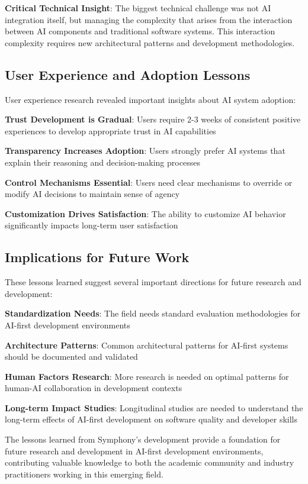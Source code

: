 \begin{alertbox}
\textbf{Critical Technical Insight}: The biggest technical challenge was not AI integration itself, but managing the complexity that arises from the interaction between AI components and traditional software systems. This interaction complexity requires new architectural patterns and development methodologies.
\end{alertbox}

\subsection*{User Experience and Adoption Lessons}

User experience research revealed important insights about AI system adoption:

\begin{expandedlist}
    \item \textbf{Trust Development is Gradual}: Users require 2-3 weeks of consistent positive experiences to develop appropriate trust in AI capabilities
    \item \textbf{Transparency Increases Adoption}: Users strongly prefer AI systems that explain their reasoning and decision-making processes
    \item \textbf{Control Mechanisms Essential}: Users need clear mechanisms to override or modify AI decisions to maintain sense of agency
    \item \textbf{Customization Drives Satisfaction}: The ability to customize AI behavior significantly impacts long-term user satisfaction
\end{expandedlist}

\subsection*{Implications for Future Work}

These lessons learned suggest several important directions for future research and development:

\begin{expandedlist}
    \item \textbf{Standardization Needs}: The field needs standard evaluation methodologies for AI-first development environments
    \item \textbf{Architecture Patterns}: Common architectural patterns for AI-first systems should be documented and validated
    \item \textbf{Human Factors Research}: More research is needed on optimal patterns for human-AI collaboration in development contexts
    \item \textbf{Long-term Impact Studies}: Longitudinal studies are needed to understand the long-term effects of AI-first development on software quality and developer skills
\end{expandedlist}

The lessons learned from Symphony's development provide a foundation for future research and development in AI-first development environments, contributing valuable knowledge to both the academic community and industry practitioners working in this emerging field.